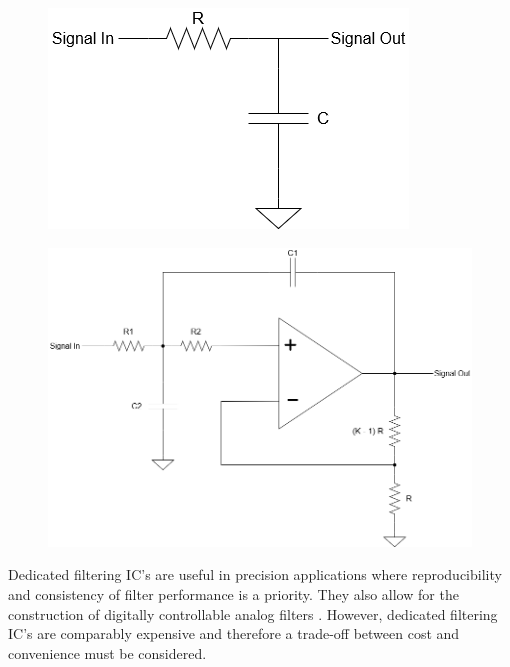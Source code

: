 \begin{figure}[H]
	\centering
	\begin{minipage}{.42\textwidth}
		\centering
		\includegraphics[width=.9\linewidth]{figures/litreview/filter_basic.png}
		\label{fig:filter_basic_lpf}
	\end{minipage}%
	\hfill
	\begin{minipage}{.54\textwidth}
		\centering
		\includegraphics[width=.9\linewidth]{figures/litreview/vcvs_filter.png}
		\label{fig:vcvs_filter_lpf}
	\end{minipage}
\end{figure}

Dedicated filtering IC's are useful in precision applications where reproducibility and consistency of filter performance is a priority. They also allow for the construction of digitally controllable analog filters \cite{Huijing2010}. However, dedicated filtering IC's are comparably expensive and therefore a trade-off between cost and convenience must be considered.

